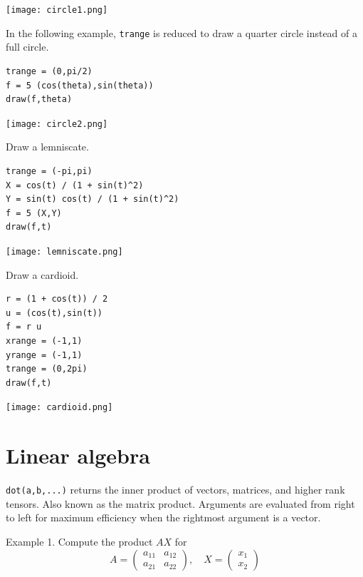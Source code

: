 \documentclass[12pt]{article}
\begin{document}
\begin{center}
\texttt{[image: circle1.png]}
\end{center}

In the following example, \verb$trange$ is reduced
to draw a quarter circle instead of a full circle.

{\color{blue}
\begin{verbatim}
trange = (0,pi/2)
f = 5 (cos(theta),sin(theta))
draw(f,theta)
\end{verbatim}}

\begin{center}
\texttt{[image: circle2.png]}
\end{center}

Draw a lemniscate.

{\color{blue}
\begin{verbatim}
trange = (-pi,pi)
X = cos(t) / (1 + sin(t)^2)
Y = sin(t) cos(t) / (1 + sin(t)^2)
f = 5 (X,Y)
draw(f,t)
\end{verbatim}}

\begin{center}
\texttt{[image: lemniscate.png]}
\end{center}

Draw a cardioid.

{\color{blue}
\begin{verbatim}
r = (1 + cos(t)) / 2
u = (cos(t),sin(t))
f = r u
xrange = (-1,1)
yrange = (-1,1)
trange = (0,2pi)
draw(f,t)
\end{verbatim}}

\begin{center}
\texttt{[image: cardioid.png]}
\end{center}

\newpage

\section{Linear algebra}

\verb$dot(a,b,...)$ returns the inner product of vectors, matrices,
and higher rank tensors.
Also known as the matrix product.
Arguments are evaluated from right to left
for maximum efficiency when the rightmost argument is a vector.

\bigskip

Example 1. Compute the product $AX$ for
\begin{equation*}
A=\begin{pmatrix}a_{11}&a_{12}\\a_{21}&a_{22}\end{pmatrix},
\quad
X=\begin{pmatrix}x_1\\x_2\end{pmatrix}
\end{equation*}
\end{document}

